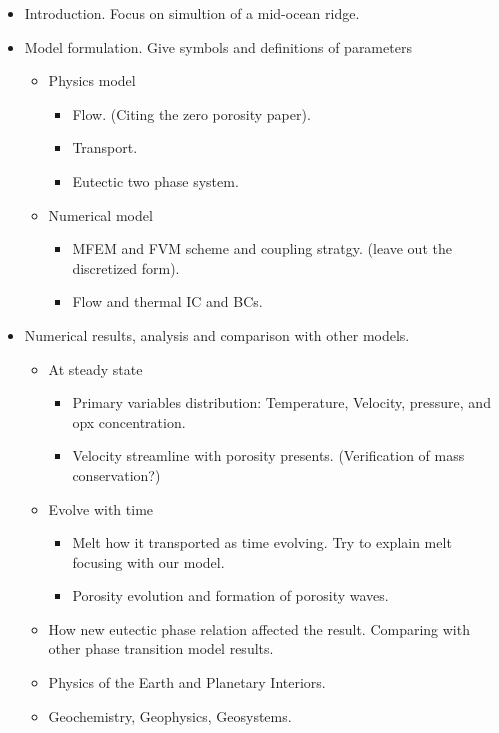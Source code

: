\begin{itemize}
\item Introduction. Focus on simultion of a mid-ocean ridge.

\item Model formulation. Give symbols and definitions of parameters
\begin{itemize}
\item Physics model
\begin{itemize}
\item Flow. (Citing the zero porosity paper).
\item Transport.
\item Eutectic two phase system.
\end{itemize}
\item Numerical model
\begin{itemize}
\item MFEM and FVM scheme and coupling stratgy. (leave out the discretized form).
\item Flow and thermal IC and BCs.
\end{itemize}
\end{itemize}

\item Numerical results, analysis and comparison with other models.
\begin{itemize}
\item At steady state
\begin{itemize}
\item Primary variables distribution: Temperature, Velocity, pressure, and opx concentration.
\item Velocity streamline with porosity presents. (Verification of mass conservation?)
\end{itemize}
\item Evolve with time
\begin{itemize}
\item Melt how it transported as time evolving. Try to explain melt focusing with our model.
\item Porosity evolution and formation of porosity waves.
\end{itemize}
\item How new eutectic phase relation affected the result. Comparing with other phase transition model results.
\end{itemize}

\vspace{2cm}

\begin{itemize}
\item Physics of the Earth and Planetary Interiors.
\item Geochemistry, Geophysics, Geosystems.
\end{itemize}

\end{itemize}
